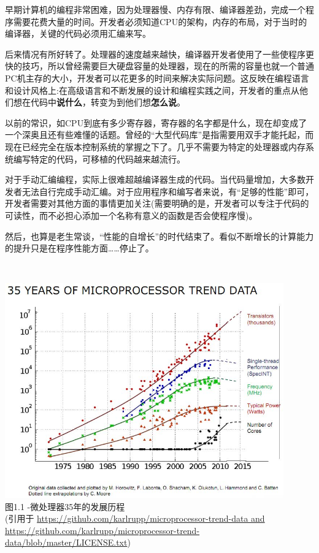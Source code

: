
早期计算机的编程非常困难，因为处理器慢、内存有限、编译器差劲，完成一个程序需要花费大量的时间。开发者必须知道CPU的架构，内存的布局，对于当时的编译器，关键的代码必须用汇编来写。

后来情况有所好转了。处理器的速度越来越快，编译器开发者使用了一些使程序更快的技巧，所以曾经需要巨大硬盘容量的处理器，现在的所需的容量也就一个普通PC机主存的大小，开发者可以花更多的时间来解决实际问题。这反映在编程语言和设计风格上:在高级语言和不断发展的设计和编程实践之间，开发者的重点从他们想在代码中\textbf{说什么}，转变为到他们想\textbf{怎么说}。

以前的常识，如CPU到底有多少寄存器，寄存器的名字都是什么，现在却变成了一个深奥且还有些难懂的话题。曾经的“大型代码库”是指需要用双手才能托起，而现在已经完全在版本控制系统的掌握之下了。几乎不需要为特定的处理器或内存系统编写特定的代码，可移植的代码越来越流行。

对于手动汇编编程，实际上很难超越编译器生成的代码。当代码量增加，大多数开发者无法自行完成手动汇编。对于应用程序和编写者来说，有“足够的性能”即可，开发者需要对其他方面的事情更加关注(需要明确的是，开发者可以专注于代码的可读性，而不必担心添加一个名称有意义的函数是否会使程序慢)。

然后，也算是老生常谈，“性能的自增长”的时代结束了。看似不断增长的计算能力的提升只是在程序性能方面……停止了。


\hspace*{\fill} \\ %
\begin{center}
\includegraphics[width=0.9\textwidth]{content/1/chapter1/images/1.jpg}\\
图1.1 -微处理器35年的发展历程 \\
(引用于 \url{https://github.com/karlrupp/microprocessor-trend-data and https://github.com/karlrupp/microprocessor-trend-data/blob/master/LICENSE.txt})
\end{center}

